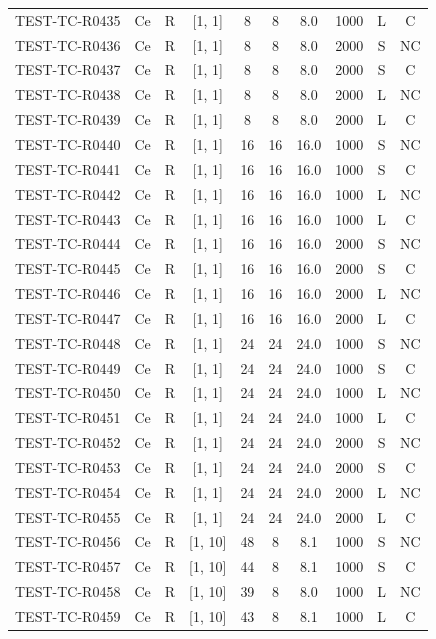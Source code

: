 \begin{longtable}{lccccccccc}
TEST-TC-R0435 & Ce & R & [1, 1] & 8 & 8 & 8.0 & 1000 & L & C \\
TEST-TC-R0436 & Ce & R & [1, 1] & 8 & 8 & 8.0 & 2000 & S & NC \\
TEST-TC-R0437 & Ce & R & [1, 1] & 8 & 8 & 8.0 & 2000 & S & C \\
TEST-TC-R0438 & Ce & R & [1, 1] & 8 & 8 & 8.0 & 2000 & L & NC \\
TEST-TC-R0439 & Ce & R & [1, 1] & 8 & 8 & 8.0 & 2000 & L & C \\
TEST-TC-R0440 & Ce & R & [1, 1] & 16 & 16 & 16.0 & 1000 & S & NC \\
TEST-TC-R0441 & Ce & R & [1, 1] & 16 & 16 & 16.0 & 1000 & S & C \\
TEST-TC-R0442 & Ce & R & [1, 1] & 16 & 16 & 16.0 & 1000 & L & NC \\
TEST-TC-R0443 & Ce & R & [1, 1] & 16 & 16 & 16.0 & 1000 & L & C \\
TEST-TC-R0444 & Ce & R & [1, 1] & 16 & 16 & 16.0 & 2000 & S & NC \\
TEST-TC-R0445 & Ce & R & [1, 1] & 16 & 16 & 16.0 & 2000 & S & C \\
TEST-TC-R0446 & Ce & R & [1, 1] & 16 & 16 & 16.0 & 2000 & L & NC \\
TEST-TC-R0447 & Ce & R & [1, 1] & 16 & 16 & 16.0 & 2000 & L & C \\
TEST-TC-R0448 & Ce & R & [1, 1] & 24 & 24 & 24.0 & 1000 & S & NC \\
TEST-TC-R0449 & Ce & R & [1, 1] & 24 & 24 & 24.0 & 1000 & S & C \\
TEST-TC-R0450 & Ce & R & [1, 1] & 24 & 24 & 24.0 & 1000 & L & NC \\
TEST-TC-R0451 & Ce & R & [1, 1] & 24 & 24 & 24.0 & 1000 & L & C \\
TEST-TC-R0452 & Ce & R & [1, 1] & 24 & 24 & 24.0 & 2000 & S & NC \\
TEST-TC-R0453 & Ce & R & [1, 1] & 24 & 24 & 24.0 & 2000 & S & C \\
TEST-TC-R0454 & Ce & R & [1, 1] & 24 & 24 & 24.0 & 2000 & L & NC \\
TEST-TC-R0455 & Ce & R & [1, 1] & 24 & 24 & 24.0 & 2000 & L & C \\
TEST-TC-R0456 & Ce & R & [1, 10] & 48 & 8 & 8.1 & 1000 & S & NC \\
TEST-TC-R0457 & Ce & R & [1, 10] & 44 & 8 & 8.1 & 1000 & S & C \\
TEST-TC-R0458 & Ce & R & [1, 10] & 39 & 8 & 8.0 & 1000 & L & NC \\
TEST-TC-R0459 & Ce & R & [1, 10] & 43 & 8 & 8.1 & 1000 & L & C \\

\end{longtable}
